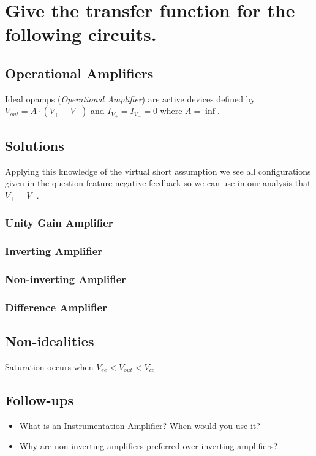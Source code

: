 \documentclass[main.tex]{subfiles}
\begin{document}
\section{Give the transfer function for the following circuits.}





\spoilerline

\subsection{Operational Amplifiers}
Ideal opamps (\textit{Operational Amplifier}) are active devices defined by $V_{out} = A \cdot (V_{+} - V_{-})$ and $I_{V_{+}} = I_{V_{-}} = 0$ where $A = \inf$. 


\subsection{Solutions}
Applying this knowledge of the virtual short assumption we see all configurations given in the question feature negative feedback so we can use in our analysis that $V_{+} = V_{-}$. 

\subsubsection{Unity Gain Amplifier}

\subsubsection{Inverting Amplifier}

\subsubsection{Non-inverting Amplifier}

\subsubsection{Difference Amplifier}

\subsection{Non-idealities}
Saturation occurs when 
$V_{ee} < V_{out} < V_{cc}$



\subsection{Follow-ups}
\begin{itemize}
    \item What is an Instrumentation Amplifier? When would you use it?
    \item Why are non-inverting amplifiers preferred over inverting amplifiers?
\end{itemize}
\end{document}
